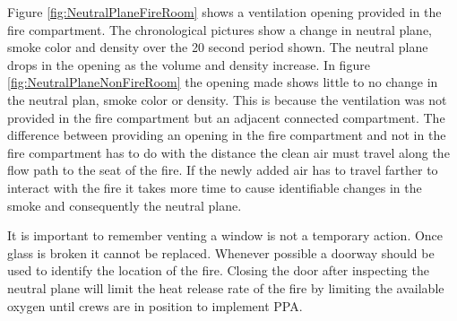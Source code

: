 \documentclass{article}
\begin{document}
Figure \ref{fig:NeutralPlaneFireRoom} shows a ventilation opening provided in the fire compartment. The chronological pictures show a change in neutral plane, smoke color and density over the 20 second period shown. The neutral plane drops in the opening as the volume and density increase. In figure \ref{fig:NeutralPlaneNonFireRoom} the opening made shows little to no change in the neutral plan, smoke color or density. This is because the ventilation was not provided in the fire compartment but an adjacent connected compartment. The difference between providing an opening in the fire compartment and not in the fire compartment has to do with the distance the clean air must travel along the flow path to the seat of the fire. If the newly added air has to travel farther to interact with the fire it takes more time to cause identifiable changes in the smoke and consequently the neutral plane.

It is important to remember venting a window is not a temporary action. Once glass is broken it cannot be replaced. Whenever possible a doorway should be used to identify the location of the fire. Closing the door after inspecting the neutral plane will  limit the heat release rate of the fire by limiting the available oxygen until crews are in position to implement PPA. 
\end{document}
